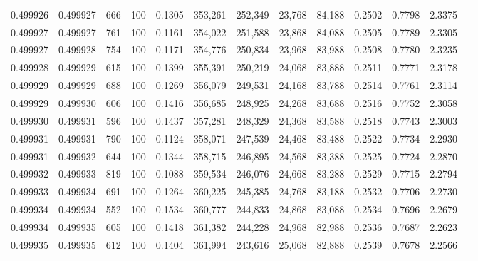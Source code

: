\begin{tabular}{rrrrrrrrrrrrr}
0.499926 & 0.499927 &   666 & 100 &                                     0.1305 & 353,261 & 252,349 &  23,768 &  84,188 & 0.2502 & 0.7798 & 2.3375 \\
0.499927 & 0.499927 &   761 & 100 &                                     0.1161 & 354,022 & 251,588 &  23,868 &  84,088 & 0.2505 & 0.7789 & 2.3305 \\
0.499927 & 0.499928 &   754 & 100 &                                     0.1171 & 354,776 & 250,834 &  23,968 &  83,988 & 0.2508 & 0.7780 & 2.3235 \\
0.499928 & 0.499929 &   615 & 100 &                                     0.1399 & 355,391 & 250,219 &  24,068 &  83,888 & 0.2511 & 0.7771 & 2.3178 \\
0.499929 & 0.499929 &   688 & 100 &                                     0.1269 & 356,079 & 249,531 &  24,168 &  83,788 & 0.2514 & 0.7761 & 2.3114 \\
0.499929 & 0.499930 &   606 & 100 &                                     0.1416 & 356,685 & 248,925 &  24,268 &  83,688 & 0.2516 & 0.7752 & 2.3058 \\
0.499930 & 0.499931 &   596 & 100 &                                     0.1437 & 357,281 & 248,329 &  24,368 &  83,588 & 0.2518 & 0.7743 & 2.3003 \\
0.499931 & 0.499931 &   790 & 100 &                                     0.1124 & 358,071 & 247,539 &  24,468 &  83,488 & 0.2522 & 0.7734 & 2.2930 \\
0.499931 & 0.499932 &   644 & 100 &                                     0.1344 & 358,715 & 246,895 &  24,568 &  83,388 & 0.2525 & 0.7724 & 2.2870 \\
0.499932 & 0.499933 &   819 & 100 &                                     0.1088 & 359,534 & 246,076 &  24,668 &  83,288 & 0.2529 & 0.7715 & 2.2794 \\
0.499933 & 0.499934 &   691 & 100 &                                     0.1264 & 360,225 & 245,385 &  24,768 &  83,188 & 0.2532 & 0.7706 & 2.2730 \\
0.499934 & 0.499934 &   552 & 100 &                                     0.1534 & 360,777 & 244,833 &  24,868 &  83,088 & 0.2534 & 0.7696 & 2.2679 \\
0.499934 & 0.499935 &   605 & 100 &                                     0.1418 & 361,382 & 244,228 &  24,968 &  82,988 & 0.2536 & 0.7687 & 2.2623 \\
0.499935 & 0.499935 &   612 & 100 &                                     0.1404 & 361,994 & 243,616 &  25,068 &  82,888 & 0.2539 & 0.7678 & 2.2566 \\

\end{tabular}

